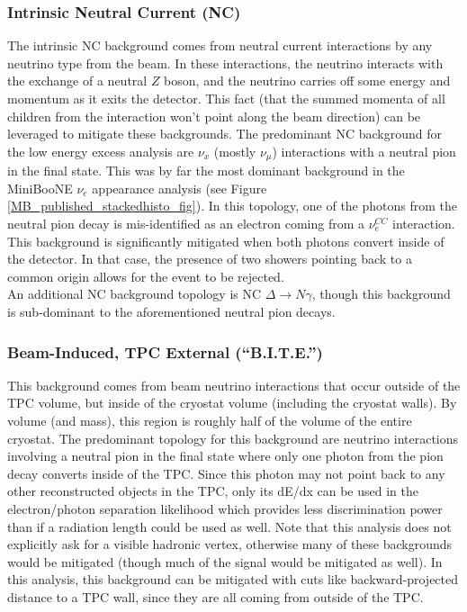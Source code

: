\subsubsection{Intrinsic Neutral Current (NC)}
The intrinsic NC background comes from neutral current interactions by any neutrino type from the beam. In these interactions, the neutrino interacts with the exchange of a neutral $Z$ boson, and the neutrino carries off some energy and momentum as it exits the detector. This fact (that the summed momenta of all children from the interaction won't point along the beam direction) can be leveraged to mitigate these backgrounds. The predominant NC background for the low energy excess analysis are $\nu_x$ (mostly $\nu_\mu$) interactions with a neutral pion in the final state. This was by far the most dominant background in the MiniBooNE $\nu_e$ appearance analysis (see Figure \ref{MB_published_stackedhisto_fig}). In this topology, one of the photons from the neutral pion decay is mis-identified as an electron coming from a $\nu_e^{CC}$ interaction. This background is significantly mitigated when both photons convert inside of the detector. In that case, the presence of two showers pointing back to a common origin allows for the event to be rejected.\\

An additional NC background topology is NC $\Delta \rightarrow N\gamma$, though this background is sub-dominant to the aforementioned neutral pion decays.

\subsubsection{Beam-Induced, TPC External (``B.I.T.E.'')}\label{BITE_physics_section}
This background comes from beam neutrino interactions that occur outside of the TPC volume, but inside of the cryostat volume (including the cryostat walls). By volume (and mass), this region is roughly half of the volume of the entire cryostat. The predominant topology for this background are neutrino interactions involving a neutral pion in the final state where only one photon from the pion decay converts inside of the TPC. Since this photon may not point back to any other reconstructed objects in the TPC, only its dE/dx can be used in the electron/photon separation likelihood which provides less discrimination power than if a radiation length could be used as well. Note that this analysis does not explicitly ask for a visible hadronic vertex, otherwise many of these backgrounds would be mitigated (though much of the signal would be mitigated as well). In this analysis, this background can be mitigated with cuts like backward-projected distance to a TPC wall, since they are all coming from outside of the TPC.

